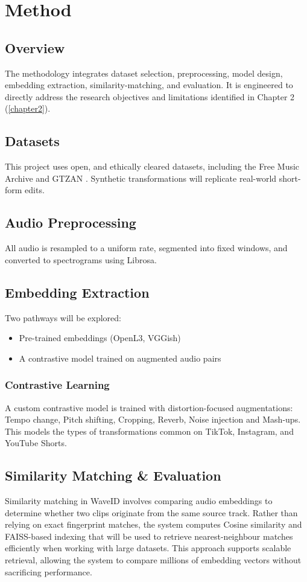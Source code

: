 \documentclass[../Thesis]{subfiles}
\begin{document}
\chapter{Method} \label{chapter3}
\section{Overview}
The methodology integrates dataset selection, preprocessing, model design, embedding extraction, similarity-matching, and evaluation. It is engineered to directly address the research objectives and limitations identified in Chapter 2 (\ref{chapter2}).

\section{Datasets}
This project uses open, and ethically cleared datasets, including the Free Music Archive and GTZAN \parencite{defferrard2017fma,tzanetakis2002genre}. Synthetic transformations will replicate real-world short-form edits.

\section{Audio Preprocessing}
All audio is resampled to a uniform rate, segmented into fixed windows, and converted to spectrograms using Librosa.

\section{Embedding Extraction}
Two pathways will be explored:
\begin{itemize}
\item Pre-trained embeddings (OpenL3, VGGish)
\item A contrastive model trained on augmented audio pairs
\end{itemize}
\subsection{Contrastive Learning}
A custom contrastive model is trained with distortion-focused augmentations: Tempo change, Pitch shifting, Cropping, Reverb, Noise injection and Mash-ups. This models the types of transformations common on TikTok, Instagram, and YouTube Shorts.

\section{Similarity Matching \& Evaluation}
Similarity matching in WaveID involves comparing audio embeddings to determine whether two clips originate from the same source track. Rather than relying on exact fingerprint matches, the system computes Cosine similarity and FAISS-based indexing \parencite{johnson2019faiss} that will be used to retrieve nearest-neighbour matches efficiently when working with large datasets. This approach supports scalable retrieval, allowing the system to compare millions of embedding vectors without sacrificing performance.
\end{document}
